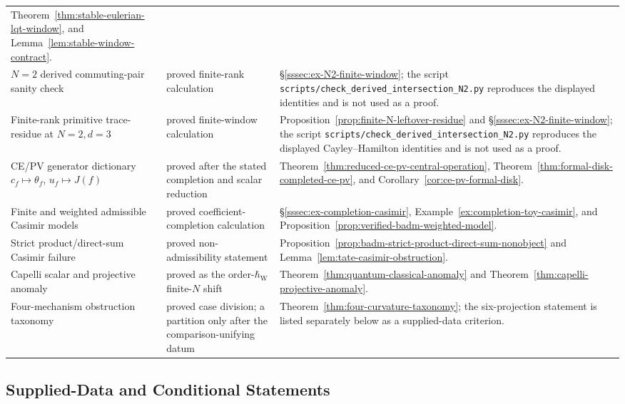\begin{center}
\begin{tabular}{@{}>{\raggedright\arraybackslash}p{}
  >{\raggedright\arraybackslash}p{}
  >{\raggedright\arraybackslash}p{}@{}}
Theorem~\ref{thm:stable-eulerian-lqt-window}, and
Lemma~\ref{lem:stable-window-contract}. \\
\(N=2\) derived commuting-pair sanity check &
proved finite-rank calculation &
\S\ref{sssec:ex-N2-finite-window}; the script
\texttt{scripts/check\_derived\_intersection\_N2.py} reproduces the
displayed identities and is not used as a proof. \\
Finite-rank primitive trace-residue at \(N=2,d=3\) &
proved finite-window calculation &
Proposition~\ref{prop:finite-N-leftover-residue} and
\S\ref{sssec:ex-N2-finite-window}; the script
\texttt{scripts/check\_derived\_intersection\_N2.py} reproduces the
displayed Cayley--Hamilton identities and is not used as a proof. \\
CE/PV generator dictionary \(c_f\mapsto\theta_f\),
\(u_f\mapsto J(f)\) &
proved after the stated completion and scalar reduction &
Theorem~\ref{thm:reduced-ce-pv-central-operation},
Theorem~\ref{thm:formal-disk-completed-ce-pv}, and
Corollary~\ref{cor:ce-pv-formal-disk}. \\
Finite and weighted admissible Casimir models &
proved coefficient-completion calculation &
\S\ref{sssec:ex-completion-casimir},
Example~\ref{ex:completion-toy-casimir}, and
Proposition~\ref{prop:verified-badm-weighted-model}. \\
Strict product/direct-sum Casimir failure &
proved non-admissibility statement &
Proposition~\ref{prop:badm-strict-product-direct-sum-nonobject} and
Lemma~\ref{lem:tate-casimir-obstruction}. \\
Capelli scalar and projective anomaly &
proved as the order-\(\hbar_{\mathrm{W}}\) finite-\(N\) shift &
Theorem~\ref{thm:quantum-classical-anomaly} and
Theorem~\ref{thm:capelli-projective-anomaly}. \\
Four-mechanism obstruction taxonomy &
proved case division; a partition only after the comparison-unifying
datum &
Theorem~\ref{thm:four-curvature-taxonomy}; the six-projection
statement is listed separately below as a supplied-data criterion. \\
\end{tabular}
\end{center}

\subsection{Supplied-Data and Conditional Statements}

